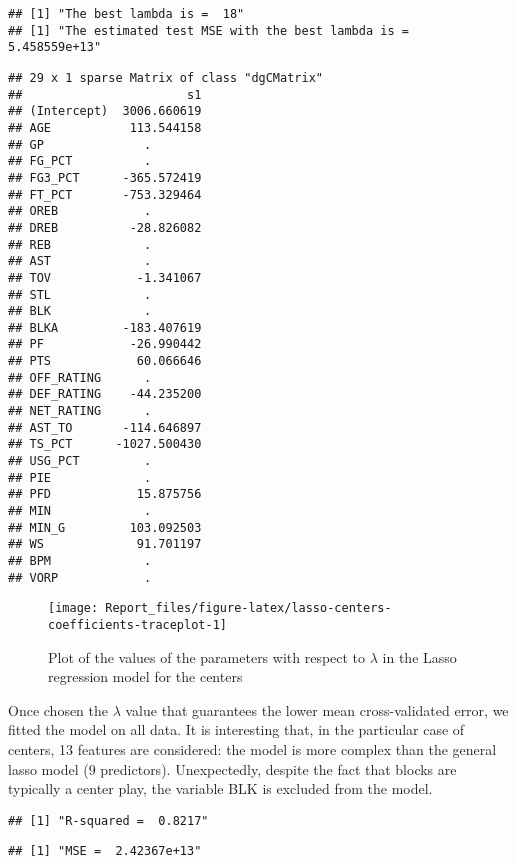 \documentclass[
]{article}
\begin{document}
\begin{verbatim}
## [1] "The best lambda is =  18"
## [1] "The estimated test MSE with the best lambda is =  5.458559e+13"
\end{verbatim}

\begin{verbatim}
## 29 x 1 sparse Matrix of class "dgCMatrix"
##                       s1
## (Intercept)  3006.660619
## AGE           113.544158
## GP              .       
## FG_PCT          .       
## FG3_PCT      -365.572419
## FT_PCT       -753.329464
## OREB            .       
## DREB          -28.826082
## REB             .       
## AST             .       
## TOV            -1.341067
## STL             .       
## BLK             .       
## BLKA         -183.407619
## PF            -26.990442
## PTS            60.066646
## OFF_RATING      .       
## DEF_RATING    -44.235200
## NET_RATING      .       
## AST_TO       -114.646897
## TS_PCT      -1027.500430
## USG_PCT         .       
## PIE             .       
## PFD            15.875756
## MIN             .       
## MIN_G         103.092503
## WS             91.701197
## BPM             .       
## VORP            .
\end{verbatim}

\begin{figure}

{\centering \texttt{[image: Report\_files/figure-latex/lasso-centers-coefficients-traceplot-1]} 

}

\caption{Plot of the values of the parameters with respect to $\lambda$ in the Lasso regression model for the centers}\label{fig:lasso-centers-coefficients-traceplot}
\end{figure}

Once chosen the \(\lambda\) value that guarantees the lower mean
cross-validated error, we fitted the model on all data. It is
interesting that, in the particular case of centers, 13 features are
considered: the model is more complex than the general lasso model (9
predictors). Unexpectedly, despite the fact that blocks are typically a
center play, the variable BLK is excluded from the model.

\begin{verbatim}
## [1] "R-squared =  0.8217"
\end{verbatim}

\begin{verbatim}
## [1] "MSE =  2.42367e+13"
\end{verbatim}
\end{document}
